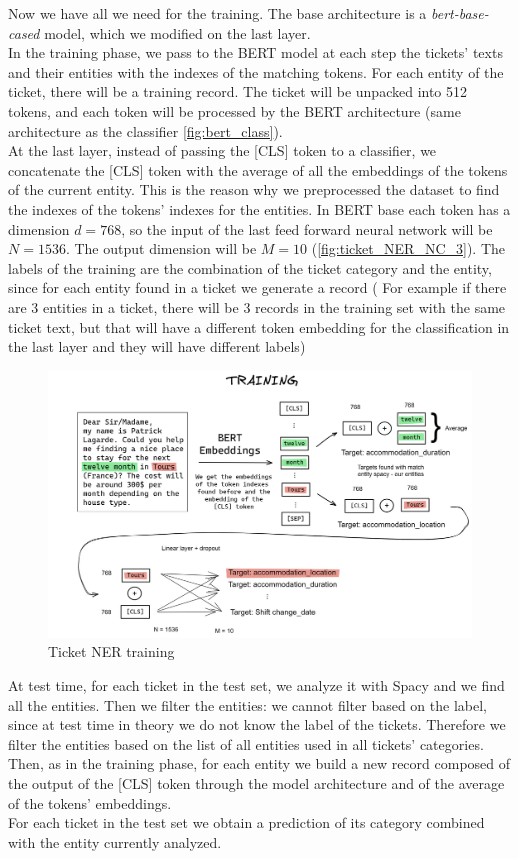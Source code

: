 Now we have all we need for the training. The base architecture is a \textit{bert-base-cased} model, which we modified on the last layer. \\
In the training phase, we pass to the BERT model at each step the tickets' texts and their entities with the indexes of the matching tokens. For each entity of the ticket, there will be a training record. The ticket will be unpacked into 512 tokens, and each token will be processed by the BERT architecture (same architecture as the classifier \autoref{fig:bert_class}). \\
At the last layer, instead of passing the [CLS] token to a classifier, we concatenate the [CLS] token with the average of all the embeddings of the tokens of the current entity. This is the reason why we preprocessed the dataset to find the indexes of the tokens' indexes for the entities. In BERT base each token has a dimension $d=768$, so the input of the last feed forward neural network will be $N=1536$. The output dimension will be $M=10$ (\autoref{fig:ticket_NER_NC_3}). The labels of the training are the combination of the ticket category and the entity, since for each entity found in a ticket we generate a record ( For example if there are 3 entities in a ticket, there will be 3 records in the training set with the same ticket text, but that will have a different token embedding for the classification in the last layer and they will have different labels)\\
\begin{figure}[h] 
    \includegraphics[width=\textwidth]{images/NER_nc_3.png}
    \caption{Ticket NER training}
    \label{fig:ticket_NER_NC_3}
\end{figure}
At test time, for each ticket in the test set, we analyze it with Spacy and we find all the entities. Then we filter the entities: we cannot filter based on the label, since at test time in theory we do not know the label of the tickets. Therefore we filter the entities based on the list of all entities used in all tickets' categories. \\
Then, as in the training phase, for each entity we build a new record composed of the output of the [CLS] token through the model architecture and of the average of the tokens' embeddings. \\
For each ticket in the test set we obtain a prediction of its category combined with the entity currently analyzed. 
